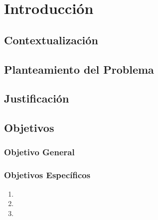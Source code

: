 \chapter{Introducción}
\label{chap:introduccion}
\section{Contextualización}
\section{Planteamiento del Problema}
\section{Justificación}
\section{Objetivos}
\subsection{Objetivo General}
\subsection{Objetivos Específicos}
\begin{enumerate}
    \item %
    \item %
    \item %
\end{enumerate}